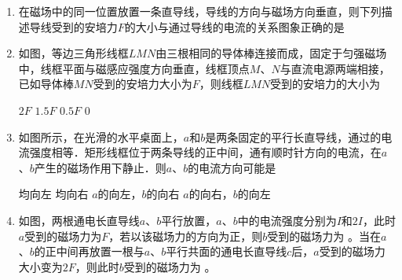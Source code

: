 

\begin{enumerate}
\item 
{}
在磁场中的同一位置放置一条直导线，导线的方向与磁场方向垂直，则下列描述导线受到的安培力$ F $的大小与通过导线的电流的关系图象正确的是  
\pfourchoices
{}
{}
{}
{}





\item
{}
如图，等边三角形线框$ LMN $由三根相同的导体棒连接而成，固定于匀强磁场中，线框平面与磁感应强度方向垂直，线框顶点$ M $、$ N $与直流电源两端相接，已如导体棒$ MN $受到的安培力大小为$ F $，则线框$ LMN $受到的安培力的大小为  
\begin{figure}[h!]
\centering

\end{figure}

\fourchoices
{$ 2F $}
{$ 1.5F $}
{$ 0.5F $}
{$ 0 $}








\item
{}
如图所示，在光滑的水平桌面上，$ a $和$ b $是两条固定的平行长直导线，通过的电流强度相等．矩形线框位于两条导线的正中间，通有顺时针方向的电流，在$ a $、$ b $产生的磁场作用下静止．则$ a $、$ b $的电流方向可能是  
\begin{figure}[h!]
	\centering

\end{figure}

\fourchoices
{均向左}
{均向右}
{$ a $的向左，$ b $的向右}
{$ a $的向右，$ b $的向左}



\item
{}
如图，两根通电长直导线$ a $、$ b $平行放置，$ a $、$ b $中的电流强度分别为$ I $和$ 2I $，此时$ a $受到的磁场力为$ F $，若以该磁场力的方向为正，则$ b $受到的磁场力为 \underlinegap 。当在$ a $、$ b $的正中间再放置一根与$ a $、$ b $平行共面的通电长直导线$ c $后，$ a $受到的磁场力大小变为$ 2F $，则此时$ b $受到的磁场力为 \underlinegap 。
\begin{figure}[h!]
\centering

\end{figure}


\end{enumerate}
